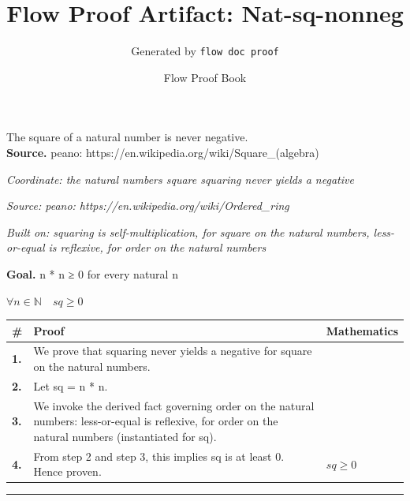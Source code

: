 \documentclass[11pt]{article}
\title{Flow Proof Artifact: Nat-sq-nonneg}
\author{Generated by \texttt{flow doc proof}}
\date{Flow Proof Book}
\theoremstyle{definition}
\begin{document}
\maketitle
The square of a natural number is never negative.\\[0.5em]
\textbf{Source.} peano: https://en.wikipedia.org/wiki/Square\_(algebra)\\[0.5em]
\bigskip
{}\par
\smallskip\noindent\textit{Coordinate: the natural numbers \cdot square \cdot squaring never yields a negative}\par
\smallskip\noindent\textit{Source: peano: https://en.wikipedia.org/wiki/Ordered\_ring}\par
\smallskip\noindent\textit{Built on: squaring is self-multiplication, for square on the natural numbers, less-or-equal is reflexive, for order on the natural numbers}\par
\medskip
\noindent\textbf{Goal.} n * n ≥ 0 for every natural n\par
\noindent$\displaystyle \forall n \in \mathbb{N}\quad sq \ge 0$\par
\medskip
\noindent
\begin{tabular}{@{} >{\raggedright\arraybackslash}p{} >{\raggedright\arraybackslash}p{} >{\raggedleft\arraybackslash}p{} @{}}
\textbf{\#} & \textbf{Proof} & \textbf{Mathematics} \\
\midrule
\textbf{1.} & We prove that squaring never yields a negative for square on the natural numbers. & \\[0.45em]
\textbf{2.} & Let sq = n * n. & \\[0.45em]
\textbf{3.} & We invoke the derived fact governing order on the natural numbers: less-or-equal is reflexive, for order on the natural numbers (instantiated for sq). & \\[0.45em]
\textbf{4.} & From step 2 and step 3, this implies sq is at least 0. Hence proven. & $\displaystyle sq \ge 0$ \\[0.45em]
\bottomrule
\end{tabular}
\label{thm:Nat-square-squaring_never_yields_a_negative}
\par\medskip\hrule
\end{document}

